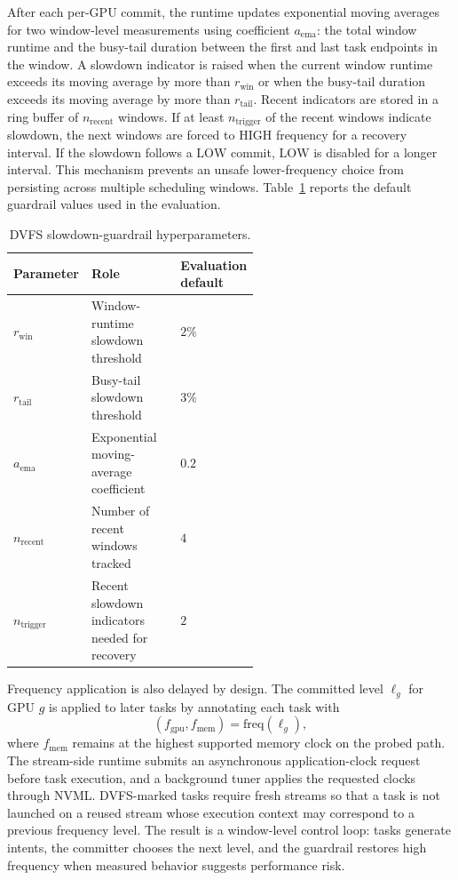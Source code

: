 After each per-GPU commit, the runtime updates exponential moving averages for two window-level measurements using coefficient $a_{\mathrm{ema}}$: the total window runtime and the busy-tail duration between the first and last task endpoints in the window. A slowdown indicator is raised when the current window runtime exceeds its moving average by more than $r_{\mathrm{win}}$ or when the busy-tail duration exceeds its moving average by more than $r_{\mathrm{tail}}$. Recent indicators are stored in a ring buffer of $n_{\mathrm{recent}}$ windows. If at least $n_{\mathrm{trigger}}$ of the recent windows indicate slowdown, the next windows are forced to $\mathrm{HIGH}$ frequency for a recovery interval. If the slowdown follows a $\mathrm{LOW}$ commit, $\mathrm{LOW}$ is disabled for a longer interval. This mechanism prevents an unsafe lower-frequency choice from persisting across multiple scheduling windows. Table~\ref{tab:dvfs-guardrail-hyperparameters} reports the default guardrail values used in the evaluation.

\begin{table}[t]
\centering
\footnotesize
\begin{tabular}{@{}lp{0.55\linewidth}l@{}}
\toprule
Parameter & Role & Evaluation default \\
\midrule
$r_{\mathrm{win}}$ & Window-runtime slowdown threshold & $2\%$ \\
$r_{\mathrm{tail}}$ & Busy-tail slowdown threshold & $3\%$ \\
$a_{\mathrm{ema}}$ & Exponential moving-average coefficient & $0.2$ \\
$n_{\mathrm{recent}}$ & Number of recent windows tracked & $4$ \\
$n_{\mathrm{trigger}}$ & Recent slowdown indicators needed for recovery & $2$ \\
\bottomrule
\end{tabular}
\caption{DVFS slowdown-guardrail hyperparameters.}
\label{tab:dvfs-guardrail-hyperparameters}
\end{table}

Frequency application is also delayed by design. The committed level $\ell_g$ for GPU $g$ is applied to later tasks by annotating each task with
\begin{equation}
(f_{\mathrm{gpu}},f_{\mathrm{mem}})
=
\mathrm{freq}(\ell_g),
\end{equation}
where $f_{\mathrm{mem}}$ remains at the highest supported memory clock on the probed path. The stream-side runtime submits an asynchronous application-clock request before task execution, and a background tuner applies the requested clocks through NVML. DVFS-marked tasks require fresh streams so that a task is not launched on a reused stream whose execution context may correspond to a previous frequency level. The result is a window-level control loop: tasks generate intents, the committer chooses the next level, and the guardrail restores high frequency when measured behavior suggests performance risk.

